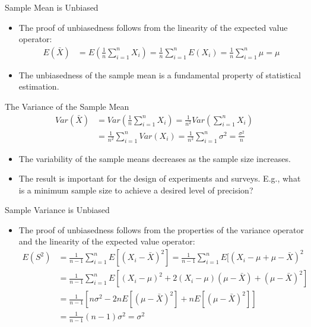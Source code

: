 \documentclass[
  ignorenonframetext,
]{beamer}
\providecommand{\tightlist}{%
  \setlength{\itemsep}{0pt}\setlength{\parskip}{0pt}}
\begin{document}
\begin{frame}{Sample Mean is Unbiased}
\protect\hypertarget{sample-mean-is-unbiased}{}
\begin{itemize}
\item
  The proof of unbiasedness follows from the linearity of the expected
  value operator: \[\begin{aligned}
  E(\bar{X}) &= E \left(\frac{1}{n} \sum_{i=1}^{n} X_i \right) 
  = \frac{1}{n} \sum_{i=1}^{n} E(X_i)
  = \frac{1}{n} \sum_{i=1}^{n} \mu
  = \mu
  \end{aligned}\]
\item
  The unbiasedness of the sample mean is a fundamental property of
  statistical estimation.
\end{itemize}
\end{frame}

\begin{frame}{The Variance of the Sample Mean}
\protect\hypertarget{the-variance-of-the-sample-mean}{}
\[\begin{aligned}
Var(\bar{X}) &= Var \left(\frac{1}{n} \sum_{i=1}^{n} X_i \right) 
= \frac{1}{n^2} Var \left(\sum_{i=1}^{n} X_i \right)\\
&= \frac{1}{n^2} \sum_{i=1}^{n} Var(X_i)
= \frac{1}{n^2} \sum_{i=1}^{n} \sigma^2
= \frac{\sigma^2}{n}
\end{aligned}\]

\begin{itemize}
\tightlist
\item
  The variability of the sample means decreases as the sample size
  increases.
\item
  The result is important for the design of experiments and surveys.
  E.g., what is a minimum sample size to achieve a desired level of
  precision?
\end{itemize}
\end{frame}

\begin{frame}{Sample Variance is Unbiased}
\protect\hypertarget{sample-variance-is-unbiased}{}
\begin{itemize}
\tightlist
\item
  The proof of unbiasedness follows from the properties of the variance
  operator and the linearity of the expected value operator:
  \[\begin{aligned}
  E(S^2) &= \frac{1}{n-1} \sum_{i=1}^{n} E[(X_i - \bar{X})^2]
  = \frac{1}{n-1} \sum_{i=1}^{n} E[(X_i - \mu + \mu - \bar{X})^2\\
  &= \frac{1}{n-1} \sum_{i=1}^{n} E[(X_i - \mu)^2 +2(X_i - \mu)(\mu - \bar{X}) + (\mu - \bar{X})^2 ]\\
  &= \frac{1}{n-1} [n \sigma^2 - 2nE[(\mu - \bar{X})^2] + nE[(\mu - \bar{X})^2]]\\
  &= \frac{1}{n-1} (n-1)\sigma^2 = \sigma^2
  \end{aligned}
  \]
\end{itemize}
\end{frame}
\end{document}
